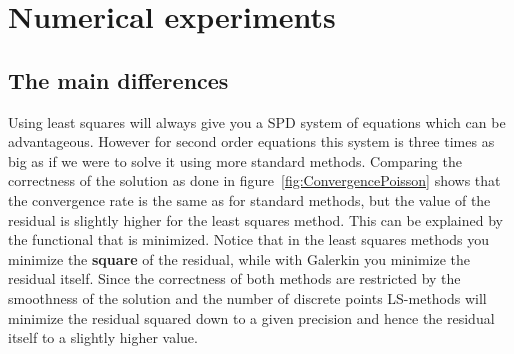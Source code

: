 
\chapter{Numerical experiments} %

\label{chap:results} %


\section{The main differences}
Using least squares will always give you a SPD system of equations which can be advantageous. However for second order equations this system is three times as big as if we were to solve it using more standard methods. Comparing the correctness of the solution as done in figure~\ref{fig:ConvergencePoisson} shows that the convergence rate is the same as for standard methods, but the value of the residual is slightly higher for the least squares method. This can be explained by the functional that is minimized. Notice that in the least squares methods you minimize the \textbf{square} of the residual, while with Galerkin you minimize the residual itself. Since the correctness of both methods are restricted by the smoothness of the solution and the number of discrete points LS-methods will minimize the residual squared down to a given precision and hence the residual itself to a slightly higher value. 
\newpage
